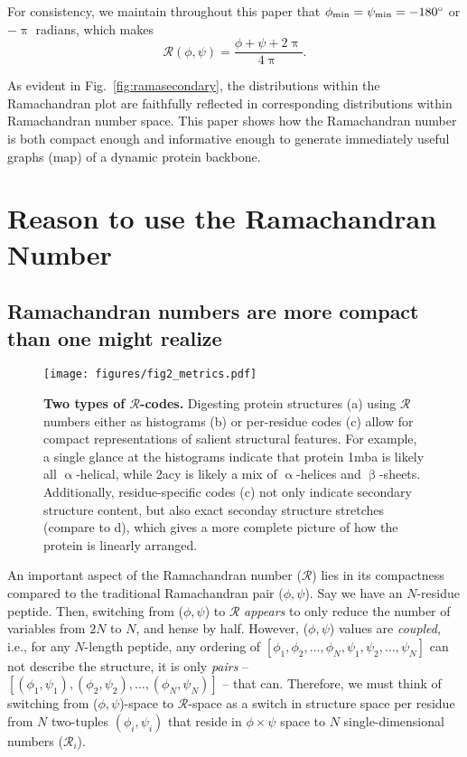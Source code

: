 \documentclass[fleqn,10pt,lineno]{wlpeerj} %
\newcommand{\Fig}[1]{Fig.~\ref{#1}}
\begin{document}
For consistency, we maintain throughout this paper that $\phi_{\rm min} = \psi_{\rm min} = -180^\circ$ or $-\uppi$ radians, which makes 
\begin{equation}
\mathcal{R}(\phi,\psi) = \frac{\phi+\psi+2\uppi}{4\uppi}.\label{eqn:rama}
\end{equation}


As evident in \Fig{fig:ramasecondary}, the distributions within the Ramachandran plot are faithfully reflected in corresponding distributions within Ramachandran number space. This paper  shows how the Ramachandran number is both compact enough and informative enough to generate immediately useful graphs (map) of a dynamic protein backbone.

\section*{Reason to use the Ramachandran Number}

\subsection*{Ramachandran numbers are more compact than one might realize}

\begin{figure}[t!]
\centering
\texttt{[image: figures/fig2\_metrics.pdf]}
\caption{\textbf{Two types of $\mathcal{R}$-codes.} Digesting protein structures (a) using $\mathcal{R}$ numbers either as histograms (b) or per-residue codes (c) allow for compact representations of salient structural features. For example, a single glance at the histograms indicate that protein 1mba is likely all $\upalpha$-helical, while 2acy is likely a mix of $\upalpha$-helices and $\upbeta$-sheets. Additionally, residue-specific codes (c) not only indicate secondary structure content, but also exact seconday structure stretches (compare to d), which gives a more complete picture of how the protein is linearly arranged. \label{fig:simple_stacks}} 
\end{figure}

An important aspect of the Ramachandran number ($\mathcal{R}$) lies in its compactness compared to the traditional Ramachandran pair ($\phi,\psi$). Say we have an $N$-residue peptide. Then, switching from ($\phi,\psi$) to $\mathcal{R}$ \textit{appears} to only reduce the number of variables from $2N$ to $N$, and hense by half. However, ($\phi,\psi$) values are {\it coupled}, i.e., for any $N$-length peptide, any ordering of $[\phi_1,\phi_2,\ldots,\phi_N,\psi_1,\psi_2,\ldots,\psi_N]$ can not describe the structure, it is only \textit{pairs} -- $[(\phi_1,\psi_1),(\phi_2,\psi_2),\ldots,(\phi_N,\psi_N)]$ -- that can. Therefore, we must think of switching from ($\phi,\psi$)-space to $\mathcal{R}$-space as a switch in structure space per residue from $N$ two-tuples $(\phi_i,\psi_i)$ that reside in $\phi\times\psi$ space to $N$ single-dimensional numbers ($\mathcal{R}_i$).
\end{document}
